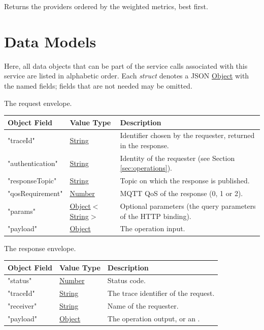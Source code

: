 \documentclass[a4paper]{arrowhead}
\newcommand{\mref}[2][]{{\textcolor{ArrowheadPurple}{\hyperref[sec:model:#2]{\ifstrempty{#1}{#2}{#1}}}}}
\newcommand{\pref}[1]{{\textcolor{ArrowheadGrey}{\hyperref[sec:model:primitives:#1]{#1}}}}
\begin{document}
Returns the providers ordered by the weighted metrics, best first.

\newpage

\section{Data Models}
\label{sec:model}

Here, all data objects that can be part of the service calls associated with this service are listed in alphabetic order.
Each \textit{struct} denotes a JSON \pref{Object} with the named fields; fields that are not needed may be omitted.


The request envelope.

\noindent\begin{tabularx}{\textwidth}{| p{4.25cm} | p{3.5cm} | X |} \hline
\rowcolor{gray!33} Object Field & Value Type & Description \\ \hline
"traceId" & \pref{String} & Identifier chosen by the requester, returned in the response. \\ \hline
"authentication" & \pref{String} & Identity of the requester (see Section \ref{sec:operations}). \\ \hline
"responseTopic" & \pref{String} & Topic on which the response is published. \\ \hline
"qosRequirement" & \pref{Number} & MQTT QoS of the response (0, 1 or 2). \\ \hline
"params" & \pref{Object}$<$\pref{String}$>$ & Optional parameters (the query parameters of the HTTP binding). \\ \hline
"payload" & \pref{Object} & The operation input. \\ \hline
\end{tabularx}


The response envelope.

\noindent\begin{tabularx}{\textwidth}{| p{4.25cm} | p{3.5cm} | X |} \hline
\rowcolor{gray!33} Object Field & Value Type & Description \\ \hline
"status" & \pref{Number} & Status code. \\ \hline
"traceId" & \pref{String} & The trace identifier of the request. \\ \hline
"receiver" & \pref{String} & Name of the requester. \\ \hline
"payload" & \pref{Object} & The operation output, or an \mref{ErrorMessage}. \\ \hline
\end{tabularx}
\end{document}
